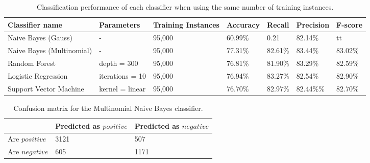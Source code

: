 \begin{table}
\centering
\caption{Classification performance of each classifier when using the same number of training instances.}
\begin{tabular}{ |p{3cm}||p{3cm}|p{2cm}|p{1.5cm}|p{1.5cm}|p{1.5cm}|p{1.5cm}| }
 \hline
 Classifier name &          Parameters &             Training Instances &    Accuracy &      Recall &     Precision& F-score \\
 \hline
 Naive Bayes (Gauss)        &-&     95,000&                 60.99\%&        0.21&       82.14\%& tt\\
  \hline
 Naive Bayes (Multinomial)  &-&     95,000& 77.31\%&        82.61\%&       83.44\%& 83.02\%\\
  \hline
 Random Forest              &depth = 300&            95,000&76.81\%&  81.90\%&     83.29\%& 82.59\%\\
  \hline
 Logistic Regression        &iterations = 10&   95,000&    76.94\%&        83.27\%&   82.54\%& 82.90\%\\
  \hline
 Support Vector Machine     &kernel = linear&   95,000&     76.70\%& 82.97\%&  82.44\%\%& 82.70\%\\
 \hline
\end{tabular}
\label{tab:evaluations_euqal}
\end{table}
\begin{table}
\centering
\caption{Confusion matrix for the Multinomial Naive Bayes classifier.}
\begin{tabular}{ |p{3cm}||p{3cm}|p{3cm}| }
 \hline
  &          Predicted as $positive$ &Predicted as $negative$  \\
 \hline
 Are $positive$        & 3121&            507\\
  \hline
 Are $negative$  &605&                     1171\\
 \hline

\end{tabular}
\label{tab:evaluations_conf}
\end{table}

